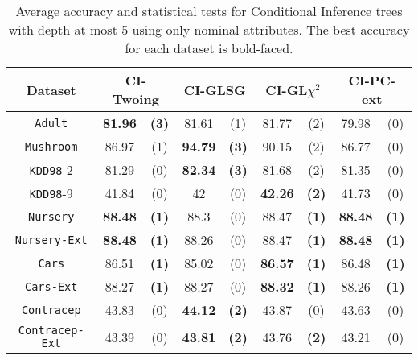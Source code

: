 \begin{table*}
\small
\centering
    \caption{Average accuracy and statistical tests  for  Conditional Inference trees 
with depth at most 5 using only nominal attributes. The best accuracy for each dataset is bold-faced.}
\label{tab:ctree-5}
\begin{tabular}{c|cc|cc|cc|cc} 
Dataset  &   \multicolumn{2}{c|}{CI-Twoing} &   \multicolumn{2}{c|}{CI-GLSG} & \multicolumn{2}{c|}{CI-GL$\chi^2$}& \multicolumn{2}{c}{CI-PC-ext} \\  \hline   
{\tt Adult}        &{\bf 81.96} &{\bf  (3)} & 81.61       & (1)       & 81.77       & (2)       & 79.98       & (0)       \\
{\tt Mushroom}     &86.97       & (1)       &{\bf  94.79 }& {\bf (3)} & 90.15       & (2)       & 86.77       & (0)       \\
{\tt KDD98}-2      &81.29       & (0)       & {\bf 82.34 }& {\bf (3) }& 81.68       & (2)       & 81.35       & (0)       \\
{\tt KDD98}-9      &41.84       & (0)       & 42          & (0)       & {\bf 42.26} & {\bf (2)} & 41.73       & (0)       \\
{\tt Nursery}      &{\bf 88.48} & {\bf (1)} & 88.3        & (0)       & 88.47       & {\bf (1)} &{\bf 88.48 } & {\bf (1)} \\
{\tt Nursery-Ext}  &{\bf 88.48} & {\bf (1)} & 88.26       & (0)       & 88.47       & {\bf (1)} &{\bf 88.48 } & {\bf (1)} \\
{\tt Cars}         &86.51       & {\bf (1)} & 85.02       & (0)       & {\bf 86.57} & {\bf (1)} & 86.48       & {\bf (1)} \\
{\tt Cars-Ext}     &88.27       & {\bf (1) }& 88.27       & (0)       & {\bf 88.32} & {\bf (1)} & 88.26       & {\bf (1)} \\
{\tt Contracep}    &43.83       & (0)       & {\bf 44.12} & {\bf (2)} & 43.87       & (0)       & 43.63       & (0)       \\
{\tt Contracep-Ext}&43.39       & (0)       & {\bf 43.81} & {\bf (2)} & 43.76       & {\bf (2)} & 43.21       & (0)       \\

\end{tabular}
\end{table*}
